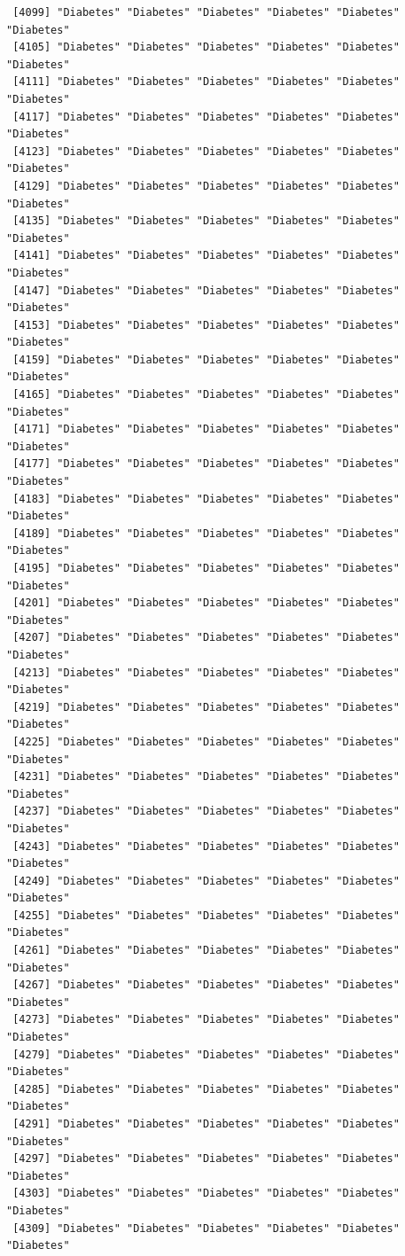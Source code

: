 \documentclass[
  letterpaper,
  DIV=11,
  numbers=noendperiod]{scrartcl}
\begin{document}
\begin{verbatim}
 [4099] "Diabetes" "Diabetes" "Diabetes" "Diabetes" "Diabetes" "Diabetes"
 [4105] "Diabetes" "Diabetes" "Diabetes" "Diabetes" "Diabetes" "Diabetes"
 [4111] "Diabetes" "Diabetes" "Diabetes" "Diabetes" "Diabetes" "Diabetes"
 [4117] "Diabetes" "Diabetes" "Diabetes" "Diabetes" "Diabetes" "Diabetes"
 [4123] "Diabetes" "Diabetes" "Diabetes" "Diabetes" "Diabetes" "Diabetes"
 [4129] "Diabetes" "Diabetes" "Diabetes" "Diabetes" "Diabetes" "Diabetes"
 [4135] "Diabetes" "Diabetes" "Diabetes" "Diabetes" "Diabetes" "Diabetes"
 [4141] "Diabetes" "Diabetes" "Diabetes" "Diabetes" "Diabetes" "Diabetes"
 [4147] "Diabetes" "Diabetes" "Diabetes" "Diabetes" "Diabetes" "Diabetes"
 [4153] "Diabetes" "Diabetes" "Diabetes" "Diabetes" "Diabetes" "Diabetes"
 [4159] "Diabetes" "Diabetes" "Diabetes" "Diabetes" "Diabetes" "Diabetes"
 [4165] "Diabetes" "Diabetes" "Diabetes" "Diabetes" "Diabetes" "Diabetes"
 [4171] "Diabetes" "Diabetes" "Diabetes" "Diabetes" "Diabetes" "Diabetes"
 [4177] "Diabetes" "Diabetes" "Diabetes" "Diabetes" "Diabetes" "Diabetes"
 [4183] "Diabetes" "Diabetes" "Diabetes" "Diabetes" "Diabetes" "Diabetes"
 [4189] "Diabetes" "Diabetes" "Diabetes" "Diabetes" "Diabetes" "Diabetes"
 [4195] "Diabetes" "Diabetes" "Diabetes" "Diabetes" "Diabetes" "Diabetes"
 [4201] "Diabetes" "Diabetes" "Diabetes" "Diabetes" "Diabetes" "Diabetes"
 [4207] "Diabetes" "Diabetes" "Diabetes" "Diabetes" "Diabetes" "Diabetes"
 [4213] "Diabetes" "Diabetes" "Diabetes" "Diabetes" "Diabetes" "Diabetes"
 [4219] "Diabetes" "Diabetes" "Diabetes" "Diabetes" "Diabetes" "Diabetes"
 [4225] "Diabetes" "Diabetes" "Diabetes" "Diabetes" "Diabetes" "Diabetes"
 [4231] "Diabetes" "Diabetes" "Diabetes" "Diabetes" "Diabetes" "Diabetes"
 [4237] "Diabetes" "Diabetes" "Diabetes" "Diabetes" "Diabetes" "Diabetes"
 [4243] "Diabetes" "Diabetes" "Diabetes" "Diabetes" "Diabetes" "Diabetes"
 [4249] "Diabetes" "Diabetes" "Diabetes" "Diabetes" "Diabetes" "Diabetes"
 [4255] "Diabetes" "Diabetes" "Diabetes" "Diabetes" "Diabetes" "Diabetes"
 [4261] "Diabetes" "Diabetes" "Diabetes" "Diabetes" "Diabetes" "Diabetes"
 [4267] "Diabetes" "Diabetes" "Diabetes" "Diabetes" "Diabetes" "Diabetes"
 [4273] "Diabetes" "Diabetes" "Diabetes" "Diabetes" "Diabetes" "Diabetes"
 [4279] "Diabetes" "Diabetes" "Diabetes" "Diabetes" "Diabetes" "Diabetes"
 [4285] "Diabetes" "Diabetes" "Diabetes" "Diabetes" "Diabetes" "Diabetes"
 [4291] "Diabetes" "Diabetes" "Diabetes" "Diabetes" "Diabetes" "Diabetes"
 [4297] "Diabetes" "Diabetes" "Diabetes" "Diabetes" "Diabetes" "Diabetes"
 [4303] "Diabetes" "Diabetes" "Diabetes" "Diabetes" "Diabetes" "Diabetes"
 [4309] "Diabetes" "Diabetes" "Diabetes" "Diabetes" "Diabetes" "Diabetes"

\end{verbatim}
\end{document}
